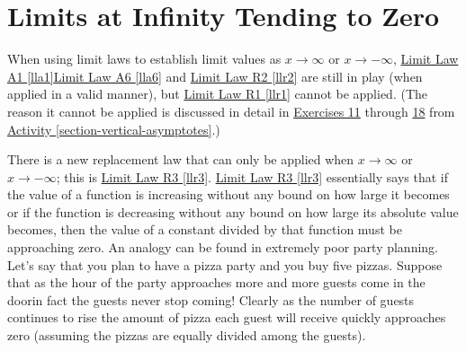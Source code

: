 \documentclass[12pt,]{book}
\theoremstyle{plain}
\theoremstyle{definition}
\numberwithin{equation}{section}
\begin{document}
\section[Limits at Infinity Tending to Zero]{Limits at Infinity Tending to Zero}\label{section-limits-at-infinity-tending-to-zero}
When using limit laws to establish limit values as \(x\to\infty\) or \(x\to-\infty\), \hyperref[lla1]{Limit Law A1 \ref{lla1}}\textendash{}\hyperref[lla6]{Limit Law A6 \ref{lla6}} and  \hyperref[llr2]{Limit Law R2 \ref{llr2}} are still in play (when applied in a valid manner), but \hyperref[llr1]{Limit Law R1 \ref{llr1}} cannot be applied. (The reason it cannot be applied is discussed in detail in \hyperlink{exercise-hear-me-first}{Exercises 11} through \hyperlink{exercise-hear-me-last}{18} from \hyperref[section-vertical-asymptotes]{Activity \ref{section-vertical-asymptotes}}.)%
\par
There is a new replacement law that can only be applied when \(x\to\infty\) or \(x\to-\infty\); this is \hyperref[llr3]{Limit Law R3 \ref{llr3}}. \hyperref[llr3]{Limit Law R3 \ref{llr3}} essentially says that if the value of a function is increasing without any bound on how large it becomes or if the function is decreasing without any bound on how large its absolute value becomes, then the value of a constant divided by that function must be approaching zero. An analogy can be found in extremely poor party planning. Let's say that you plan to have a pizza party and you buy five pizzas. Suppose that as the hour of the party approaches more and more guests come in the door\textemdash{}in fact the guests never stop coming! Clearly as the number of guests continues to rise the amount of pizza each guest will receive quickly approaches zero (assuming the pizzas are equally divided among the guests).%
\typeout{************************************************}
\typeout{************************************************}
\end{document}
